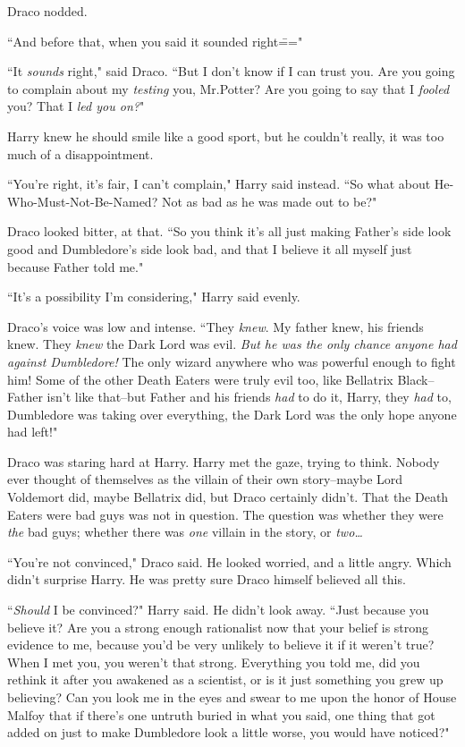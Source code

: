 Draco nodded.

``And before that, when you said it sounded right\==="

``It \emph{sounds} right," said Draco. ``But I don't know if I can trust you. Are you going to complain about my \emph{testing} you, Mr.\?Potter? Are you going to say that I \emph{fooled} you? That I \emph{led you on?}"

Harry knew he should smile like a good sport, but he couldn't really, it was too much of a disappointment.

``You're right, it's fair, I can't complain," Harry said instead. ``So what about He-Who-Must-Not-Be-Named? Not as bad as he was made out to be?"

Draco looked bitter, at that. ``So you think it's all just making Father's side look good and Dumbledore's side look bad, and that I believe it all myself just because Father told me."

``It's a possibility I'm considering," Harry said evenly.

Draco's voice was low and intense. ``They \emph{knew}. My father knew, his friends knew. They \emph{knew} the Dark Lord was evil. \emph{But he was the only chance anyone had against Dumbledore!} The only wizard anywhere who was powerful enough to fight him! Some of the other Death Eaters were truly evil too, like Bellatrix Black\---Father isn't like that\---but Father and his friends \emph{had} to do it, Harry, they \emph{had} to, Dumbledore was taking over everything, the Dark Lord was the only hope anyone had left!"

Draco was staring hard at Harry. Harry met the gaze, trying to think. Nobody ever thought of themselves as the villain of their own story\---maybe Lord Voldemort did, maybe Bellatrix did, but Draco certainly didn't. That the Death Eaters were bad guys was not in question. The question was whether they were \emph{the} bad guys; whether there was \emph{one} villain in the story, or \emph{two{\ldots}}

``You're not convinced," Draco said. He looked worried, and a little angry. Which didn't surprise Harry. He was pretty sure Draco himself believed all this.

``\emph{Should} I be convinced?" Harry said. He didn't look away. ``Just because you believe it? Are you a strong enough rationalist now that your belief is strong evidence to me, because you'd be very unlikely to believe it if it weren't true? When I met you, you weren't that strong. Everything you told me, did you rethink it after you awakened as a scientist, or is it just something you grew up believing? Can you look me in the eyes and swear to me upon the honor of House Malfoy that if there's one untruth buried in what you said, one thing that got added on just to make Dumbledore look a little worse, you would have noticed?"

